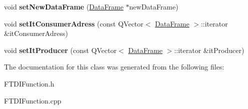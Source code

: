 \begin{DoxyCompactItemize}
void {\bfseries set\+New\+Data\+Frame} (\hyperlink{class_data_frame}{Data\+Frame} $\ast$new\+Data\+Frame)
\item 
\mbox{\label{class_f_t_d_i_function_abb1c121f5beb7acd92b99294f33e6ac7}} 
void {\bfseries set\+It\+Consumer\+Adress} (const Q\+Vector$<$ \hyperlink{class_data_frame}{Data\+Frame} $>$\+::iterator \&it\+Consumer\+Adress)
\item 
\mbox{\label{class_f_t_d_i_function_af8b813dfa79d10d40c9a8a5165153785}} 
void {\bfseries set\+It\+Producer} (const Q\+Vector$<$ \hyperlink{class_data_frame}{Data\+Frame} $>$\+::iterator \&it\+Producer)
\end{DoxyCompactItemize}


The documentation for this class was generated from the following files\+:\begin{DoxyCompactItemize}
\item 
F\+T\+D\+I\+Function.\+h\item 
F\+T\+D\+I\+Function.\+cpp\end{DoxyCompactItemize}

